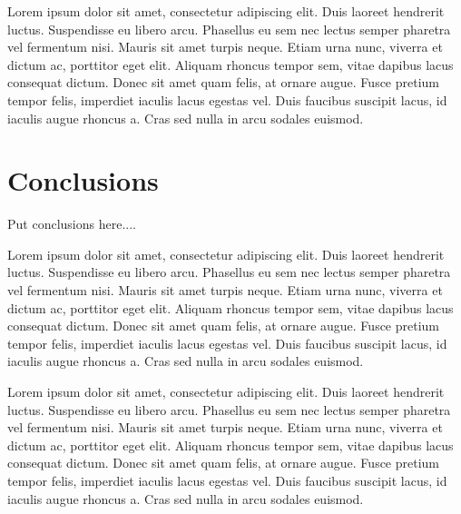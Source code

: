 \documentclass[final,conference,10pt]{IEEEtran}
\begin{document}
Lorem ipsum dolor sit amet, consectetur adipiscing elit. Duis laoreet hendrerit luctus. Suspendisse eu libero arcu. Phasellus eu sem nec lectus semper pharetra vel fermentum nisi. Mauris sit amet turpis neque. Etiam urna nunc, viverra et dictum ac, porttitor eget elit. Aliquam rhoncus tempor sem, vitae dapibus lacus consequat dictum. Donec sit amet quam felis, at ornare augue. Fusce pretium tempor felis, imperdiet iaculis lacus egestas vel. Duis faucibus suscipit lacus, id iaculis augue rhoncus a. Cras sed nulla in arcu sodales euismod.

\section{Conclusions}

Put conclusions here....

Lorem ipsum dolor sit amet, consectetur adipiscing elit. Duis laoreet hendrerit luctus. Suspendisse eu libero arcu. Phasellus eu sem nec lectus semper pharetra vel fermentum nisi. Mauris sit amet turpis neque. Etiam urna nunc, viverra et dictum ac, porttitor eget elit. Aliquam rhoncus tempor sem, vitae dapibus lacus consequat dictum. Donec sit amet quam felis, at ornare augue. Fusce pretium tempor felis, imperdiet iaculis lacus egestas vel. Duis faucibus suscipit lacus, id iaculis augue rhoncus a. Cras sed nulla in arcu sodales euismod.

Lorem ipsum dolor sit amet, consectetur adipiscing elit. Duis laoreet hendrerit luctus. Suspendisse eu libero arcu. Phasellus eu sem nec lectus semper pharetra vel fermentum nisi. Mauris sit amet turpis neque. Etiam urna nunc, viverra et dictum ac, porttitor eget elit. Aliquam rhoncus tempor sem, vitae dapibus lacus consequat dictum. Donec sit amet quam felis, at ornare augue. Fusce pretium tempor felis, imperdiet iaculis lacus egestas vel. Duis faucibus suscipit lacus, id iaculis augue rhoncus a. Cras sed nulla in arcu sodales euismod.



\pagebreak
\end{document}

